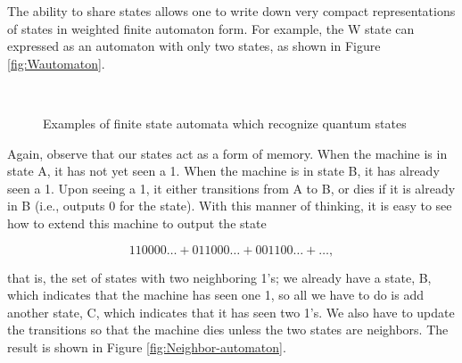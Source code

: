 \documentclass[12pt]{amsbook}
\theoremstyle{plain}
\theoremstyle{definition}
\theoremstyle{remark}
\begin{document}
The ability to share states allows one to write down very compact
 representations of states in weighted finite automaton form.  For example, the W state can expressed as an automaton with only two states, as shown in Figure \ref{fig:Wautomaton}.

\begin{figure}
\\
\caption{Examples of finite state automata which recognize quantum states}
\end{figure}

Again, observe that our states act as a form of memory.  When the machine is in state A, it has not yet seen a 1.  When the machine is in state B, it has already seen a 1.  Upon seeing a 1, it either transitions from A to B, or dies if it is already in B (i.e., outputs 0 for the state).  With this manner of thinking, it is easy to see how to extend this machine to output the state

$$110000\dots + 011000\dots + 001100\dots + \dots,$$

\noindent that is, the set of states with two neighboring 1's;  we already have a state, B, which indicates that the machine has seen one 1, so all we have to do is add another state, C, which indicates that it has seen two 1's.  We also have to update the transitions so that the machine dies unless the two states are neighbors.  The result is shown in Figure \ref{fig:Neighbor-automaton}.
\end{document}

